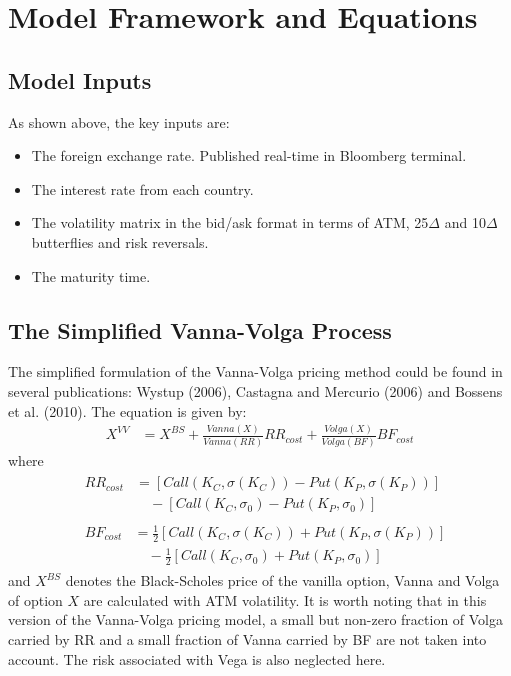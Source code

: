 \section{Model Framework and Equations}
\subsection{Model Inputs}
As shown above, the key inputs are:
\begin{itemize}
	\item The foreign exchange rate. Published real-time in Bloomberg terminal.
	\item The interest rate from each country.
	\item The volatility matrix in the bid/ask format in terms of ATM, 25$\Delta$ and 10$\Delta$ butterflies and risk reversals.
	\item The maturity time.
\end{itemize}

\subsection{The Simplified Vanna-Volga Process}
The simplified formulation of the Vanna-Volga pricing method could be found in several publications: Wystup (2006), Castagna and Mercurio (2006) and Bossens et al. (2010).
The equation is given by:
\begin{align}
X^{VV} &= X^{BS} + \frac{Vanna(X)}{Vanna(RR)}RR_{cost}+ \frac{Volga(X)}{Volga(BF)}BF_{cost}
\end{align}
where
\begin{align}
&\begin{aligned}
RR_{cost} &= \left[Call\left( K_C,\sigma\left( K_C\right) \right) -Put\left( K_P,\sigma\left( K_P\right) \right)\right] \\
&\quad - \left[Call\left( K_C,\sigma_0 \right) -Put\left( K_P,\sigma_0 \right)\right]
\end{aligned} \\
&\begin{aligned}
BF_{cost} &= \frac{1}{2} \left[Call\left( K_C,\sigma\left( K_C\right) \right) +Put\left( K_P,\sigma\left( K_P\right) \right)\right] \\
&\quad - \frac{1}{2}\left[Call\left( K_C,\sigma_0 \right) + Put\left( K_P,\sigma_0 \right)\right]
\end{aligned}
\end{align}
and $X^{BS}$ denotes the Black-Scholes price of the vanilla option, Vanna and Volga of option $X$ are calculated with ATM volatility. \newline
\newline
It is worth noting that in this version of the Vanna-Volga pricing model, a small but non-zero fraction of Volga carried by RR and a small fraction of Vanna carried by BF are not taken into account. The risk associated with Vega is also neglected here.


